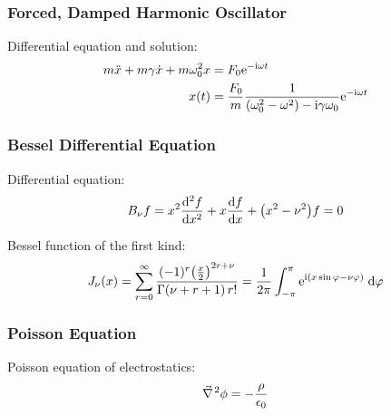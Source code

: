 		\subsubsection{Forced, Damped Harmonic Oscillator}
			\noindent
			Differential equation and solution:
			\begin{equation}
				\begin{aligned}
					m\ddot{x}+m\gamma\dot{x}+m\omega_0^2 x &= F_0 \mathrm{e}^{-\mathrm{i}\omega t} \\
					x(t) &= \frac{F_0}{m} \frac{1}{\left(\omega_0^2-\omega^2\right)-\mathrm{i} \gamma\omega_0} \mathrm{e}^{-\mathrm{i}\omega t}
				\end{aligned}
			\end{equation}

		\subsubsection{Bessel Differential Equation}
			\noindent
			Differential equation:
			\begin{equation}
				B_\nu f = x^2\dv[2]{f}{x} + x\dv{f}{x}+\qty(x^2-\nu^2)f = 0
			\end{equation}

			\noindent
			Bessel function of the first kind:
			\begin{equation}
				J_\nu(x) = \sum_{r=0}^\infty \frac{(-1)^r\qty(\frac{x}{2})^{2r+\nu}}{\Gamma(\nu+r+1)\,r!} = \frac{1}{2\pi}\int_{-\pi}^{\pi} \mathrm{e}^{\mathrm{i}(x\sin\varphi-\nu\varphi)}\;\dd\varphi
			\end{equation}

		\subsubsection{Poisson Equation}
			\noindent
			Poisson equation of electrostatics:
			\begin{equation}
				\Nabla^2\phi = -\frac{\rho}{\epsilon_0}
			\end{equation}

